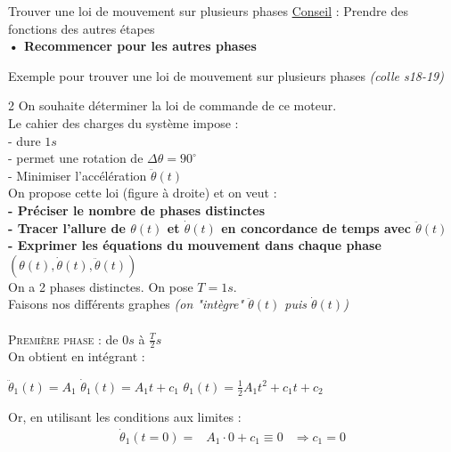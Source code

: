 \documentclass{article} %
\begin{document}
{\begin{méthode}{Trouver une loi de mouvement sur plusieurs phases}
{\small \hspace*{20pt}\underline{Conseil} : Prendre des fonctions des autres étapes }\vspace*{5pt}\\
\textbf{• Recommencer pour les autres phases}
\end{méthode}\pagebreak
\begin{exemple}{Exemple pour trouver une loi de mouvement sur plusieurs phases \textit{(colle s18-19)}}
\begin{multicols}{2}
On souhaite déterminer la loi de commande de ce moteur.\\
Le cahier des charges du système impose :\\
\hspace*{10pt}- dure $1s$\\
\hspace*{10pt}- permet une rotation de $\Delta\theta=90^\circ$\\
\hspace*{10pt}- Minimiser l'accélération $\ddot{\theta}(t)$\\
On propose cette loi (figure à droite) et on veut :\vspace{4pt}\\
\textbf{- Préciser le nombre de phases distinctes\\
- Tracer l'allure de $\theta(t)$ et $\dot{\theta}(t)$ en concordance de temps avec 
$\ddot{\theta}(t)$\\
- Exprimer les équations du mouvement dans chaque phase $(\theta(t),\dot{\theta}(t),\ddot{\theta}(t))$}\vspace{10pt}\\
On a 2 phases distinctes.
On pose $T=1s$.\\
Faisons nos différents graphes \textit{(on "intègre" $\ddot{\theta}(t)$ puis $\dot{\theta}(t)$)}\\\\
\textsc{Première phase} : de $0s$ à $\frac{T}{2}s$\\
On obtient en intégrant :
\begin{center}
$\ddot{\theta}_1(t)=A_1$  \hspace{7pt} $\dot{\theta}_1(t)=A_1t+c_1$ \hspace{7pt} $\theta_1(t)=\frac{1}{2}A_1t^2+c_1t+c_2$
\end{center}
Or, en utilisant les conditions aux limites :
\noindent\begin{align*}
\dot{\theta}_1(t=0) =& A_1 \cdot 0 + c_1 \equiv 0 &\Rightarrow c_1=0\\

\end{align*}
\end{multicols}
\end{exemple}}
\end{document}
